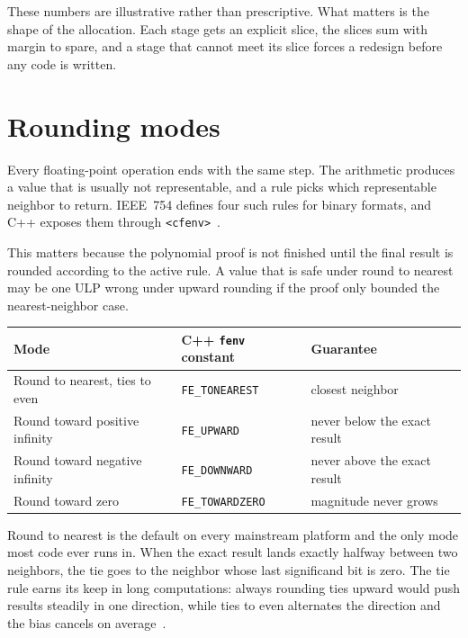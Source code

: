 \documentclass[manuscript, nonacm]{acmart}
\begin{document}
    These numbers are illustrative rather than prescriptive. What matters is
    the shape of the allocation. Each stage gets an explicit slice, the
    slices sum with margin to spare, and a stage that cannot meet its slice
    forces a redesign before any code is written.



    \section{Rounding modes}
    \label{sec:roundingmodes}

    Every floating-point operation ends with the same step. The arithmetic
    produces a value that is usually not representable, and a rule picks which
    representable neighbor to return. IEEE~754 defines four such rules for
    binary formats, and C++ exposes them through \texttt{<cfenv>}~\cite{ieee}.

    This matters because the polynomial proof is not finished until the final
    result is rounded according to the active rule. A value that is safe under
    round to nearest may be one ULP wrong under upward rounding if the proof only
    bounded the nearest-neighbor case.

    \begin{table}[tbp]
        \centering
        \begin{tabular}{lll}
            \toprule
            Mode                           & C++ \texttt{fenv} constant & Guarantee                    \\
            \midrule
            Round to nearest, ties to even & \texttt{FE\_TONEAREST}     & closest neighbor             \\
            Round toward positive infinity & \texttt{FE\_UPWARD}        & never below the exact result \\
            Round toward negative infinity & \texttt{FE\_DOWNWARD}      & never above the exact result \\
            Round toward zero              & \texttt{FE\_TOWARDZERO}    & magnitude never grows        \\
            \bottomrule
        \end{tabular}
    \end{table}

    Round to nearest is the default on every mainstream platform and the only
    mode most code ever runs in. When the exact result lands exactly halfway
    between two neighbors, the tie goes to the neighbor whose last
    significand bit is zero. The tie rule earns its keep in long
    computations: always rounding ties upward would push results steadily in
    one direction, while ties to even alternates the direction and the bias
    cancels on average~\cite{handbook}.
\end{document}
